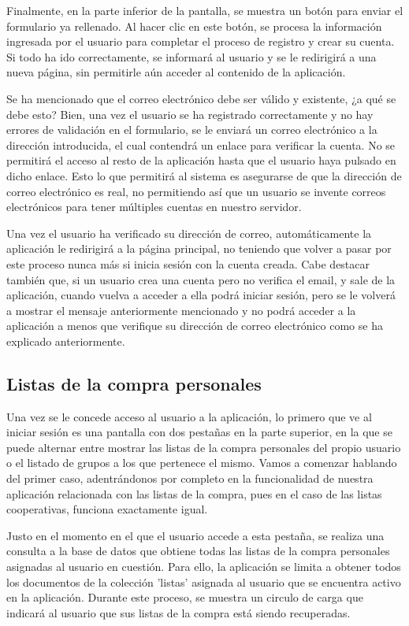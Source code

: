 \documentclass{article}
\begin{document}
Finalmente, en la parte inferior de la pantalla, se muestra un botón para enviar el formulario ya rellenado. Al hacer clic en este botón, se procesa la información ingresada por el usuario para completar el proceso de registro y crear su cuenta. Si todo ha ido correctamente, se informará al usuario y se le redirigirá a una nueva página, sin permitirle aún acceder al contenido de la aplicación.

Se ha mencionado que el correo electrónico debe ser válido y existente, ¿a qué se debe esto? Bien, una vez el usuario se ha registrado correctamente y no hay errores de validación en el formulario, se le enviará un correo electrónico a la dirección introducida, el cual contendrá un enlace para verificar la cuenta. No se permitirá el acceso al resto de la aplicación hasta que el usuario haya pulsado en dicho enlace. Esto lo que permitirá al sistema es asegurarse de que la dirección de correo electrónico es real, no permitiendo así que un usuario se invente correos electrónicos para tener múltiples cuentas en nuestro servidor.

\newpage

Una vez el usuario ha verificado su dirección de correo, automáticamente la aplicación le redirigirá a la página principal, no teniendo que volver a pasar por este proceso nunca más si inicia sesión con la cuenta creada. Cabe destacar también que, si un usuario crea una cuenta pero no verifica el email, y sale de la aplicación, cuando vuelva a acceder a ella podrá iniciar sesión, pero se le volverá a mostrar el mensaje anteriormente mencionado y no podrá acceder a la aplicación a menos que verifique su dirección de correo electrónico como se ha explicado anteriormente.

\subsection{Listas de la compra personales}

Una vez se le concede acceso al usuario a la aplicación, lo primero que ve al iniciar sesión es una pantalla con dos pestañas en la parte superior, en la que se puede alternar entre mostrar las listas de la compra personales del propio usuario o el listado de grupos a los que pertenece el mismo. Vamos a comenzar hablando del primer caso, adentrándonos por completo en la funcionalidad de nuestra aplicación relacionada con las listas de la compra, pues en el caso de las listas cooperativas, funciona exactamente igual.

Justo en el momento en el que el usuario accede a esta pestaña, se realiza una consulta a la base de datos que obtiene todas las listas de la compra personales asignadas al usuario en cuestión. Para ello, la aplicación se limita a obtener todos los documentos de la colección 'listas' asignada al usuario que se encuentra activo en la aplicación. Durante este proceso, se muestra un circulo de carga que indicará al usuario que sus listas de la compra está siendo recuperadas.
\end{document}
